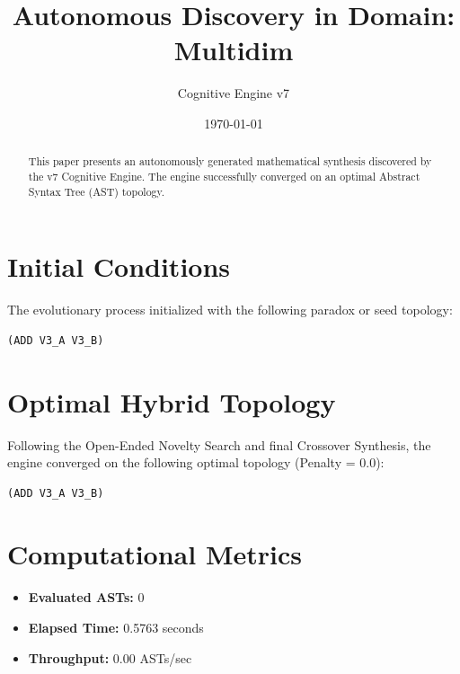 \documentclass{article}
\title{Autonomous Discovery in Domain: Multidim}
\author{Cognitive Engine v7}
\date{\today}
\begin{document}
\maketitle
\begin{abstract}
This paper presents an autonomously generated mathematical synthesis discovered by the v7 Cognitive Engine. The engine successfully converged on an optimal Abstract Syntax Tree (AST) topology.\end{abstract}
\section{Initial Conditions}
The evolutionary process initialized with the following paradox or seed topology:
\begin{verbatim}
(ADD V3_A V3_B)
\end{verbatim}
\section{Optimal Hybrid Topology}
Following the Open-Ended Novelty Search and final Crossover Synthesis, the engine converged on the following optimal topology (Penalty = 0.0):
\begin{verbatim}
(ADD V3_A V3_B)
\end{verbatim}
\section{Computational Metrics}
\begin{itemize}
  \item \textbf{Evaluated ASTs:} 0
  \item \textbf{Elapsed Time:} 0.5763 seconds
  \item \textbf{Throughput:} 0.00 ASTs/sec
\end{itemize}
\end{document}
